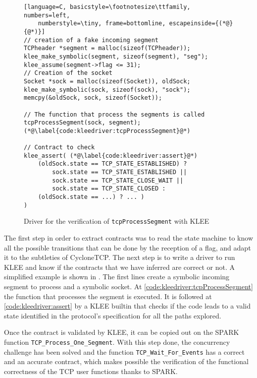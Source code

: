 \documentclass[conference]{IEEEtran}
\def\spark#1{\lstinline[language=Ada]{#1}}
\begin{document}
\begin{figure}
\begin{lstlisting}[language=C, basicstyle=\footnotesize\ttfamily, numbers=left,
    numberstyle=\tiny, frame=bottomline, escapeinside={(*@}{@*)}]
// creation of a fake incoming segment
TCPheader *segment = malloc(sizeof(TCPheader));
klee_make_symbolic(segment, sizeof(segment), "seg");
klee_assume(segment->flag <= 31);
// Creation of the socket
Socket *sock = malloc(sizeof(Socket)), oldSock;
klee_make_symbolic(sock, sizeof(sock), "sock");
memcpy(&oldSock, sock, sizeof(Socket));

// The function that process the segments is called
tcpProcessSegment(sock, segment); (*@\label{code:kleedriver:tcpProcessSegment}@*)

// Contract to check
klee_assert( (*@\label{code:kleedriver:assert}@*)
    (oldSock.state == TCP_STATE_ESTABLISHED) ?
        sock.state == TCP_STATE_ESTABLISHED ||
        sock.state == TCP_STATE_CLOSE_WAIT ||
        sock.state == TCP_STATE_CLOSED :
    (oldSock.state == ...) ? ... )
)
\end{lstlisting}
\caption{Driver for the verification of \lstinline[language=C]{tcpProcessSegment}
with KLEE}
\label{code:kleedriver}
\end{figure}


The first step in order to extract contracts was to read the state machine to
know all the possible transitions that can be done by the reception of a flag,
and adapt it to
the subtleties of CycloneTCP. The next step is to write a driver to run KLEE and
know if the contracts that we have inferred are correct or not.
A simplified example is shown in . The first lines
create a symbolic incoming segment to process and a symbolic socket.
At \cref{code:kleedriver:tcpProcessSegment} the function that processes the
segment is executed. It is followed at \cref{code:kleedriver:assert} by a KLEE
builtin that checks if the code leads to a valid state identified in the
protocol’s specification for all the paths explored.

Once the contract is validated by KLEE, it can be copied out on the SPARK
function \spark{TCP_Process_One_Segment}. With this step done, the concurrency
challenge has been solved and the function
\spark{TCP_Wait_For_Events} has a correct and an accurate contract, which
makes possible the verification of the functional correctness of the TCP user
functions thanks to SPARK.
\end{document}
